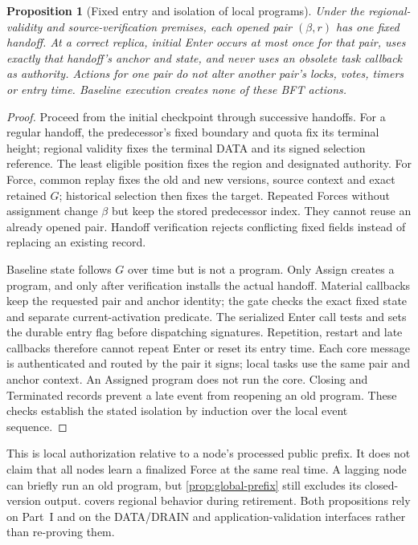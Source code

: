 \documentclass[11pt,a4paper]{article}
\newtheorem{proposition}[proposition]{Proposition}
\begin{document}
\begin{proposition}[Fixed entry and isolation of local programs]
\label{prop:program-isolation}
Under the regional-validity and source-verification premises, each
opened pair $(\beta,r)$ has one fixed handoff. At a correct replica,
initial Enter occurs at most once for that pair, uses exactly that
handoff's anchor and state, and never uses an obsolete task callback
as authority. Actions for one pair do not alter another pair's locks,
votes, timers or entry time. Baseline execution creates none of
these BFT actions.
\end{proposition}
\begin{proof}
Proceed from the initial checkpoint through successive handoffs.
For a regular handoff, the predecessor's fixed boundary and quota fix
its terminal height; regional validity fixes the terminal DATA and its
signed selection reference. The least eligible position fixes the
region and designated authority. For Force, common replay fixes the
old and new versions, source context and exact retained $G$; historical
selection then fixes the target. Repeated Forces without assignment
change $\beta$ but keep the stored predecessor index. They cannot
reuse an already opened pair. Handoff verification rejects conflicting
fixed fields instead of replacing an existing record.

Baseline state follows $G$ over time but is not a program. Only Assign
creates a program, and only after verification installs the actual
handoff.
Material callbacks keep the requested pair and anchor identity;
the gate checks the exact fixed state and separate current-activation predicate.
The serialized Enter call tests and sets the durable entry flag
before dispatching signatures. Repetition, restart and late callbacks
therefore cannot repeat Enter or reset its entry time. Each core
message is authenticated and routed by the pair it signs; local tasks
use the same pair and anchor context. An Assigned program does not run
the core.
Closing and Terminated records prevent a late event from reopening an
old program. These checks establish the stated isolation by induction
over the local event sequence.
\end{proof}

This is local authorization relative to a node's processed public
prefix. It does not claim that all nodes learn a finalized Force at the
same real time. A lagging node can briefly run an old program, but
\cref{prop:global-prefix} still excludes its closed-version output.
 covers regional behavior during
retirement. Both propositions rely on Part~I and on the DATA/DRAIN and
application-validation interfaces rather than re-proving them.
\end{document}
